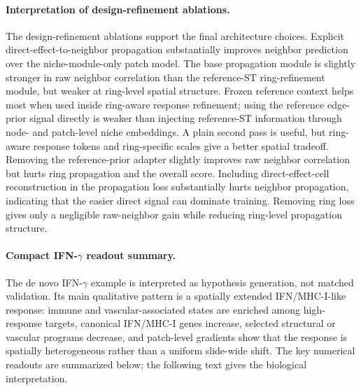 \documentclass[sigconf,review,balance=false]{acmart}
\begin{document}
\paragraph{Interpretation of design-refinement ablations.}
The design-refinement ablations support the final architecture choices. Explicit direct-effect-to-neighbor propagation substantially improves neighbor prediction over the niche-module-only patch model. The base propagation module is slightly stronger in raw neighbor correlation than the reference-ST ring-refinement module, but weaker at ring-level spatial structure. Frozen reference context helps most when used inside ring-aware response refinement; using the reference edge-prior signal directly is weaker than injecting reference-ST information through node- and patch-level niche embeddings. A plain second pass is useful, but ring-aware response tokens and ring-specific scales give a better spatial tradeoff. Removing the reference-prior adapter slightly improves raw neighbor correlation but hurts ring propagation and the overall score. Including direct-effect-cell reconstruction in the propagation loss substantially hurts neighbor propagation, indicating that the easier direct signal can dominate training. Removing ring loss gives only a negligible raw-neighbor gain while reducing ring-level propagation structure.

\paragraph{Compact IFN-\texorpdfstring{$\gamma$}{gamma} readout summary.}
The de novo IFN-$\gamma$ example is interpreted as hypothesis generation, not matched validation. Its main qualitative pattern is a spatially extended IFN/MHC-I-like response: immune and vascular-associated states are enriched among high-response targets, canonical IFN/MHC-I genes increase, selected structural or vascular programs decrease, and patch-level gradients show that the response is spatially heterogeneous rather than a uniform slide-wide shift. The key numerical readouts are summarized below; the following text gives the biological interpretation.
\end{document}
